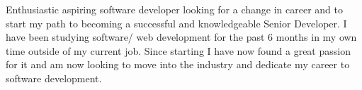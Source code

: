 \par{
  Enthusiastic aspiring software
  developer looking for a change
  in career and to start my path to
  becoming a successful and
  knowledgeable Senior
  Developer. I have been studying
  software/ web development for
  the past 6 months in my own
  time outside of my current job.
  Since starting I have now found
  a great passion for it and am
  now looking to move into the
  industry and dedicate my career
  to software development.\\
}
